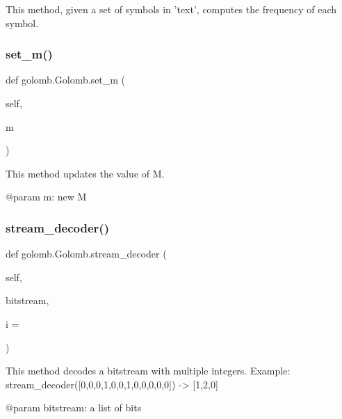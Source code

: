 \begin{DoxyVerb}This method, given a set of symbols in 'text', computes the frequency of each symbol.
\end{DoxyVerb}
 \mbox{\label{classgolomb_1_1Golomb_ada3ec35e72fd5a5340a285a491caa320}} 
\subsubsection{\texorpdfstring{set\+\_\+m()}{set\_m()}}
{\footnotesize\ttfamily def golomb.\+Golomb.\+set\+\_\+m (\begin{DoxyParamCaption}\item[{}]{self,  }\item[{}]{m }\end{DoxyParamCaption})}

\begin{DoxyVerb}This method updates the value of M.

@param m: new M
\end{DoxyVerb}
 \mbox{\label{classgolomb_1_1Golomb_ad2e9e349b933a32cc542d2f72f8f02d4}} 
\subsubsection{\texorpdfstring{stream\+\_\+decoder()}{stream\_decoder()}}
{\footnotesize\ttfamily def golomb.\+Golomb.\+stream\+\_\+decoder (\begin{DoxyParamCaption}\item[{}]{self,  }\item[{}]{bitstream,  }\item[{}]{i = {} }\end{DoxyParamCaption})}

\begin{DoxyVerb}This method decodes a bitstream with multiple integers.
Example: stream_decoder([0,0,0,1,0,0,1,0,0,0,0,0]) -> [1,2,0]

@param bitstream: a list of bits
\end{DoxyVerb}
 \mbox{\label{classgolomb_1_1Golomb_a18dc23f3d187a8e83e93c2f957df1f10}} 

